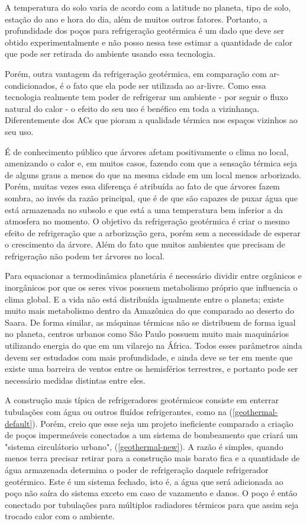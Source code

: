A temperatura do solo varia de acordo com a latitude no planeta, tipo de solo, estação do ano e hora do dia, além de muitos outros fatores. Portanto, a profundidade dos poços para refrigeração geotérmica é um dado que deve ser obtido experimentalmente e não posso nessa tese estimar a quantidade de calor que pode ser retirada do ambiente usando essa tecnologia.

Porém, outra vantagem da refrigeração geotérmica, em comparação com ar-condicionados, é o fato que ela pode ser utilizada ao ar-livre. Como essa tecnologia realmente tem poder de refrigerar um ambiente - por seguir o fluxo natural do calor - o efeito do seu uso é benéfico em toda a vizinhança. Diferentemente dos ACs que pioram a qualidade térmica nos espaços vizinhos ao seu uso.

É de conhecimento público que árvores afetam positivamente o clima no local, amenizando o calor e, em muitos casos, fazendo com que a sensação térmica seja de alguns graus a menos do que na mesma cidade em um local menos arborizado. Porém, muitas vezes essa diferença é atribuída ao fato de que árvores fazem sombra, ao invés da razão principal, que é de que são capazes de puxar água que está armazenada no subsolo e que está a uma temperatura bem inferior a da atmosfera no momento. O objetivo da refrigeração geotérmica é criar o mesmo efeito de refrigeração que a arborização gera, porém sem a necessidade de esperar o crescimento da árvore. Além do fato que muitos ambientes que precisam de refrigeração não podem ter árvores no local. 

Para equacionar a termodinâmica planetária é necessário dividir entre orgânicos e inorgânicos por que os seres vivos possuem metabolismo próprio que influencia o clima global. E a vida não está distribuída igualmente entre o planeta; existe muito mais metabolismo dentro da Amazônica do que comparado ao deserto do Saara. 
De forma similar, as máquinas térmicas não se distribuem de forma igual no planeta, centros urbanos como São Paulo possuem muito mais maquinários utilizando energia do que em um vilarejo na África. Todos esses parâmetros ainda devem ser estudados com mais profundidade, e ainda deve se ter em mente que existe uma barreira de ventos entre os hemisférios terrestres, e portanto pode ser necessário medidas distintas entre eles.

A construção mais típica de refrigeradores geotérmicos consiste em enterrar tubulações com água ou outros fluídos refrigerantes, como na (\autoref{geothermal-default}). Porém, creio que esse seja um projeto ineficiente comparado a criação de poços impermeáveis conectados a um sistema de bombeamento que criará um "sistema circulátorio urbano", (\autoref{geothermal-new}). A razão é simples, quando menos terra precisar retirar para a construção mais barato fica e a quantidade de água armazenada determina o poder de refrigeração daquele refrigerador geotérmico. Este é um sistema fechado, isto é, a água que será adicionada ao poço não saíra do sistema exceto em caso de vazamento e danos.
O poço é então conectado por tubulações para múltiplos radiadores térmicos para que assim seja trocado calor com o ambiente. 

